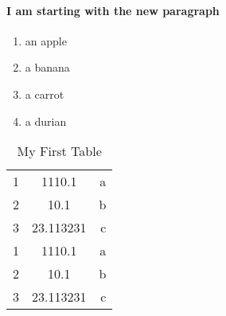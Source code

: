 \documentclass{article}
\begin{document}
\paragraph{I am starting with the new paragraph}

\begin{enumerate}
\item an apple
\item a banana
\item a carrot
\item a durian
\end{enumerate}
\begin{table}
  \caption{My First Table}
  \begin{tabular}{l|c|r}
      \hline
      1 & 1110.1 & a\\
      2 & 10.1 & b\\
      3 & 23.113231 & c\\
      \hline
      1 & 1110.1 & a\\
      2 & 10.1 & b\\
      3 & 23.113231 & c\\
    \end{tabular}
 
\end{table}
\end{document}
